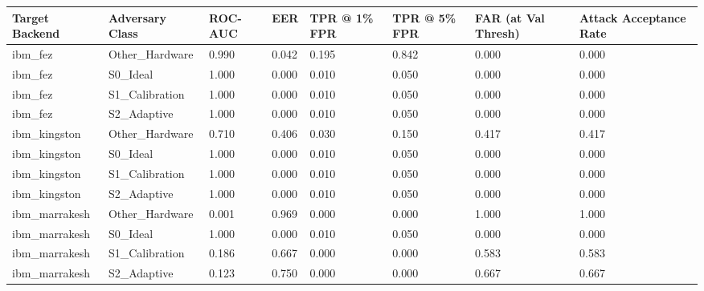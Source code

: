\begin{tabular}{llllllll}
\toprule
Target Backend & Adversary Class & ROC-AUC & EER & TPR @ 1\% FPR & TPR @ 5\% FPR & FAR (at Val Thresh) & Attack Acceptance Rate \\
\midrule
ibm_fez & Other_Hardware & 0.990 & 0.042 & 0.195 & 0.842 & 0.000 & 0.000 \\
ibm_fez & S0_Ideal & 1.000 & 0.000 & 0.010 & 0.050 & 0.000 & 0.000 \\
ibm_fez & S1_Calibration & 1.000 & 0.000 & 0.010 & 0.050 & 0.000 & 0.000 \\
ibm_fez & S2_Adaptive & 1.000 & 0.000 & 0.010 & 0.050 & 0.000 & 0.000 \\
ibm_kingston & Other_Hardware & 0.710 & 0.406 & 0.030 & 0.150 & 0.417 & 0.417 \\
ibm_kingston & S0_Ideal & 1.000 & 0.000 & 0.010 & 0.050 & 0.000 & 0.000 \\
ibm_kingston & S1_Calibration & 1.000 & 0.000 & 0.010 & 0.050 & 0.000 & 0.000 \\
ibm_kingston & S2_Adaptive & 1.000 & 0.000 & 0.010 & 0.050 & 0.000 & 0.000 \\
ibm_marrakesh & Other_Hardware & 0.001 & 0.969 & 0.000 & 0.000 & 1.000 & 1.000 \\
ibm_marrakesh & S0_Ideal & 1.000 & 0.000 & 0.010 & 0.050 & 0.000 & 0.000 \\
ibm_marrakesh & S1_Calibration & 0.186 & 0.667 & 0.000 & 0.000 & 0.583 & 0.583 \\
ibm_marrakesh & S2_Adaptive & 0.123 & 0.750 & 0.000 & 0.000 & 0.667 & 0.667 \\
\bottomrule
\end{tabular}
